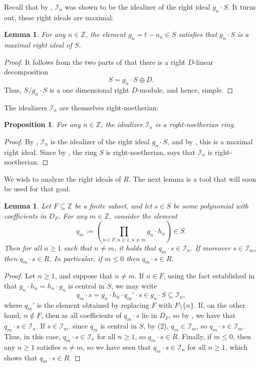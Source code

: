 \documentclass{amsart}
\newtheorem{prop}[equation]{Proposition}
\newtheorem{lem}[equation]{Lemma}
\theoremstyle{definition}
\numberwithin{equation}{section}
\begin{document}
Recall that by , $\mathcal{I}_n$ was shown to be the idealizer of the right ideal $g_n \cdot S$. It turns out, these right ideals are maximal:

\begin{lem}\label{lem:gnMaximal}
For any $n \in \mathbb{Z}$,
the element $g_n = t- u_n \in S$ satisfies that $g_n \cdot S$ is a maximal right ideal of $S$.
\end{lem}
\begin{proof}
It follows from the two parts of  that there is a right $D$-linear decomposition
\[
S = g_n \cdot S \oplus D.
\]
Thus, $S/g_n\cdot S$ is a one dimensional right $D$-module,
and hence, simple.
\end{proof}

The idealizers $\mathcal{I}_n$ are themselves right-noetherian:
\begin{prop}\label{prop:idealizerNoeth}
For any $n \in \mathbb{Z}$,
the idealizer $\mathcal{I}_n$ is a right-noetherian ring.
\end{prop}
\begin{proof}
By ,
$\mathcal{I}_n$ is the idealizer of the right ideal $g_n\cdot S$,
and by , this is a maximal right ideal.
Since by ,
the ring $S$ is right-noetherian,
\cite[Theorem 1.1.12(iii)]{NCBook} says that $\mathcal{I}_n$ is right-noetherian.
\end{proof}

We wish to analyze the right ideals of $R$.
The next lemma is a tool that will soon be used for that goal.

\begin{lem}\label{lem:mult}
Let $F \subseteq \mathbb{Z}$ be a finite subset, 
and let $s \in S$ be some polynomial with coefficients in $D_F$.
For any $m \in \mathbb{Z}$,
consider the element
\[
q_m := \left(\prod_{n \in F, n\ge 1, n \ne m} g_n \cdot h_n\right) \in S.
\]
Then for all $n \ge 1$ such that $n \ne m$,
it holds that $q_m \cdot s\in \mathcal{I}_n$.
If moreover $s \in \mathcal{I}_m$, then $q_m \cdot s \in R$.
In particular, if $m \le 0$ then $q_m \cdot s \in R$.
\end{lem}
\begin{proof}
Let $n \ge 1$,
and suppose that $n \ne m$.
If $n \in F$, using the fact established in  that $g_n \cdot h_n = h_n \cdot g_n$ is central in $S$,
we may write
\[
q_m \cdot s = g_n \cdot h_n \cdot q_m' \cdot s \in g_n \cdot S \subseteq \mathcal{I}_n,
\]
where $q_m'$ is the element obtained by replacing $F$ with $F\setminus\{n\}$.
If, on the other hand, $n \notin F$,
then as all coefficients of $q_m\cdot s$ lie in $D_F$,
so by , we have that $q_m \cdot s \in \mathcal{I}_n$.
If $s \in \mathcal{I}_m$,
since $q_m$ is central in $S$,
by (2), $q_m \in \mathcal{I}_m$,
so $q_m\cdot s \in \mathcal{I}_m$.
Thus, in this case, $q_m\cdot s \in \mathcal{I}_n$ for all $n \ge 1$,
so $q_m \cdot s \in R$.
Finally, if $m \le 0$, then any $n \ge 1$ satisfies $n \ne m$,
so we have seen that $q_m \cdot s \in \mathcal{I}_n$ for all $n \ge 1$,
which shows that $q_m \cdot s \in R$.
\end{proof}
\end{document}
